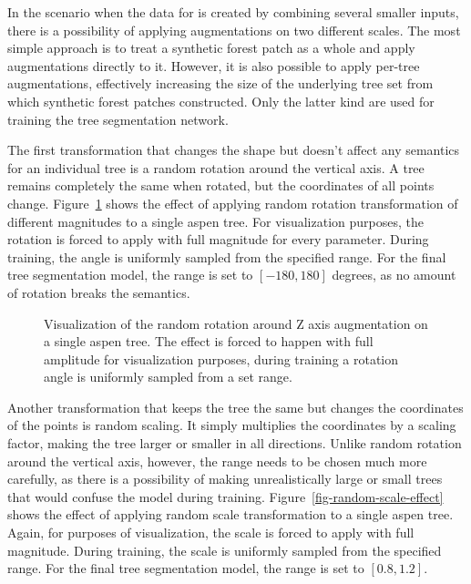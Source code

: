 In the scenario when the data for is created by combining several smaller inputs, there is a possibility of applying augmentations on two different scales.
The most simple approach is to treat a synthetic forest patch as a whole and apply augmentations directly to it.
However, it is also possible to apply per-tree augmentations, effectively increasing the size of the underlying tree set from which synthetic forest patches constructed.
Only the latter kind are used for training the tree segmentation network.

The first transformation that changes the shape but doesn't affect any semantics for an individual tree is a random rotation around the vertical axis.
A tree remains completely the same when rotated, but the coordinates of all points change.
Figure~\ref{fig-random-rotate-effect} shows the effect of applying random rotation transformation of different magnitudes to a single aspen tree.
For visualization purposes, the rotation is forced to apply with full magnitude for every parameter.
During training, the angle is uniformly sampled from the specified range.
For the final tree segmentation model, the range is set to $[-180, 180]$ degrees, as no amount of rotation breaks the semantics.

\begin{figure}
\caption[Visualization of the random rotation around Z axis augmentation on a single aspen tree.]{\label{fig-random-rotate-effect}Visualization of the random
rotation around Z axis augmentation on a single aspen tree. The effect
is forced to happen with full amplitude for visualization purposes,
during training a rotation angle is uniformly sampled from a set range.}
\end{figure}%

Another transformation that keeps the tree the same but changes the coordinates of the points is random scaling.
It simply multiplies the coordinates by a scaling factor, making the tree larger or smaller in all directions.
Unlike random rotation around the vertical axis, however, the range needs to be chosen much more carefully, as there is a possibility of making unrealistically large or small trees that would confuse the model during training.
Figure~\ref{fig-random-scale-effect} shows the effect of applying random scale transformation to a single aspen tree.
Again, for purposes of visualization, the scale is forced to apply with full magnitude.
During training, the scale is uniformly sampled from the specified range.
For the final tree segmentation model, the range is set to $[0.8, 1.2]$.

